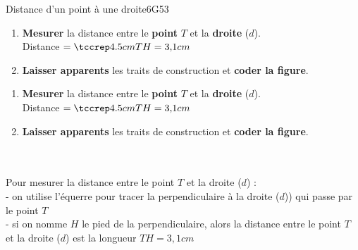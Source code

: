 \def\points{1}
\def\rdifficulty{2}
\begin{EXOEVAL}{Distance d'un point à une droite}{6G53}

    

	\begin{enumerate}[itemsep=1em]
		\item {}\textbf{Mesurer} la distance entre le \textbf{point} $T$ et la \textbf{droite} ($d$).\\
 Distance $ = \repsim[4.5cm]{TH = 3{,}1 cm}$\\

 		\item {}\textbf{Laisser apparents} les traits de construction et \textbf{coder la figure}.\\
 	\end{enumerate}
 \begin{center}
 \end{center}

\exocorrection

\begin{enumerate}[itemsep=1em]
	\item \textbf{Mesurer} la distance entre le \textbf{point} $T$ et la \textbf{droite} ($d$).\\
Distance $ = \repsim[4.5cm]{TH = 3{,}1 cm}$\\

	 \item \textbf{Laisser apparents} les traits de construction et \textbf{coder la figure}.\\
 \end{enumerate}
 \\\\Pour mesurer la distance entre le point $T$ et la droite ($d$) :\\
      - on utilise l'équerre pour tracer la perpendiculaire à la droite ($d$)) qui passe par le point $T$\\
      - si on nomme $H$ le pied de la perpendiculaire, alors la distance entre le point $T$ et la droite ($d$) est la longueur $TH = 3{,}1 cm$


\end{EXOEVAL}
